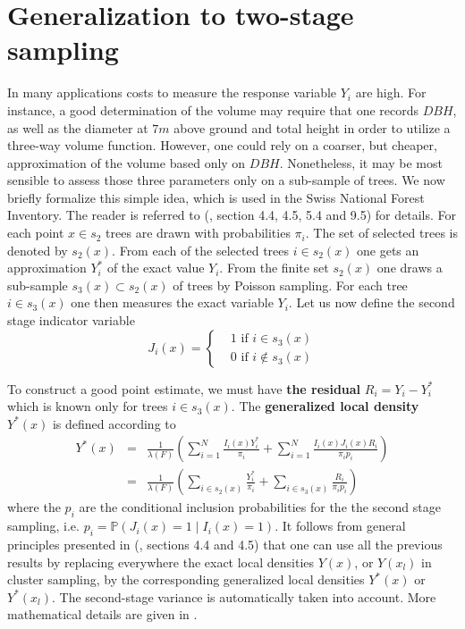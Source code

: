 \documentclass[a4paper,12pt,leqno, titlepage]{article}
\newcommand{\LF}{\ensuremath{\lambda(F)}}
\newcommand{\PR}{\mathbb{P}}
\begin{document}
\section{Generalization to two-stage sampling}
In many applications costs to measure the response variable $Y_i$ are high. For instance,
a good determination of the volume may require that one records
$DBH$, as well as the diameter at $7m$ above ground and total height
in order to utilize a three-way volume function. However, one could rely
on a coarser, but cheaper, approximation of the volume based only on
$DBH$. Nonetheless, it may be most sensible to assess those three
parameters only on a sub-sample of trees. We now briefly formalize this
simple idea, which is used in the Swiss National Forest Inventory. The reader is referred to (\cite{mandallaz}, section 4.4, 4.5, 5.4 and 9.5) for details. For each point $x\in{s_2}$ trees are drawn with
probabilities $\pi_i$. The set of selected trees is denoted by
$s_{2}(x)$. From each of the selected trees $i\in{s_{2}(x)}$ one
gets an approximation $Y_i^*$ of the exact value $Y_i$. From the
finite set $s_{2}(x)$ one draws a sub-sample
$s_{3}(x)\subset{s_{2}(x)}$ of trees by Poisson sampling. For each tree $i\in{s_{3}(x)}$
one then measures the exact variable $Y_i$. Let us now define the
second stage indicator variable
\begin{equation}
 J_i(x)=\begin{cases}&1 \text{ if $i\in s_{3}(x)$}\\
                      &0 \text{ if $i\not\in s_{3}(x)$}
         \end{cases}
\end{equation}

 \par To construct a good point estimate, we must have
 \textbf{the residual} $R_i=Y_i-Y_i^*$ which is known only for trees
 $i\in{s_{3}(x)}$. The \textbf{generalized local density} $Y^*(x)$ is defined
 according to    
 \begin{eqnarray}\label{gdens}
 Y^*(x)&=&\frac{1}{\LF}\left( \sum_{i=1}^N \frac{I_{i}(x)Y_i^*}{\pi_i} +
 \sum_{i=1}^N \frac{I_{i}(x)J_{i}(x)R_i}{\pi_{i}p_i}\right)\nonumber \\
 &=&\frac{1}{\LF}\left( \sum_{i\in{s_{2}(x)}} \frac{Y_i^*}{\pi_i}
 +\sum_{i\in{s_{3}(x)}} \frac{R_i}{\pi_{i}p_i}\right)
 \end{eqnarray}
 where the $p_i$ are the conditional inclusion probabilities for the the second stage sampling, i.e. $p_i=\PR(J_i(x)=1 \mid I_i(x)=1)$.
 It follows from general principles presented in (\cite{mandallaz}, sections 4.4 and 4.5) that one can use all the previous results by replacing everywhere the exact local densities $Y(x)$, or $Y(x_l)$ in cluster sampling, by the corresponding generalized local densities $Y^*(x)$ or $Y^*(x_l)$. The second-stage variance is automatically taken into account. More mathematical details are given in \cite{mandallazreport5}.
 \newpage
\end{document}
